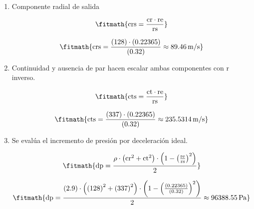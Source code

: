 \begin{enumerate}

\item Componente radial de salida

\[\fitmath{\mathrm{crs}=\frac{\mathrm{cr}\cdot \mathrm{re}}{\mathrm{rs}}}\]

\[\fitmath{\mathrm{crs}=\frac{(128)\cdot (0.22365)}{(0.32)}\approx 89.46\,\mathrm{m/s}}\]

\item Continuidad y ausencia de par hacen escalar ambas componentes con r inverso.

\[\fitmath{\mathrm{cts}=\frac{\mathrm{ct}\cdot \mathrm{re}}{\mathrm{rs}}}\]

\[\fitmath{\mathrm{cts}=\frac{(337)\cdot (0.22365)}{(0.32)}\approx 235.5314\,\mathrm{m/s}}\]

\item Se evalúa el incremento de presión por deceleración ideal.

\[\fitmath{\mathrm{dp}=\frac{\rho\cdot \left({\mathrm{cr}}^{2}+{\mathrm{ct}}^{2}\right)\cdot \left(1-{\left(\frac{\mathrm{re}}{\mathrm{rs}}\right)}^{2}\right)}{2}}\]

\[\fitmath{\mathrm{dp}=\frac{(2.9)\cdot \left({(128)}^{2}+{(337)}^{2}\right)\cdot \left(1-{\left(\frac{(0.22365)}{(0.32)}\right)}^{2}\right)}{2}\approx 96388.55\,\mathrm{Pa}}\]

\end{enumerate}
